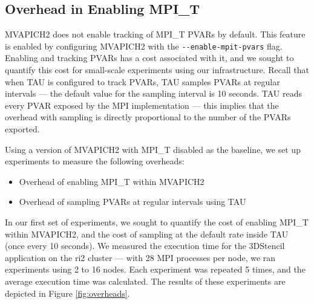 \subsection{Overhead in Enabling MPI\_T}
MVAPICH2 does not enable tracking of MPI\_T PVARs by default. This feature is enabled by configuring MVAPICH2 with the \verb+--enable-mpit-pvars+ flag. Enabling and tracking PVARs has a cost associated with it, and we sought to quantify this cost for small-scale experiments using our infrastructure. Recall that when TAU is configured to track PVARs, TAU samples PVARs at regular intervals --- the default value for the sampling interval is 10 seconds. TAU reads every PVAR exposed by the MPI implementation --- this implies that the overhead with sampling is directly proportional to the number of the PVARs exported. 
\par Using a version of MVAPICH2 with MPI\_T disabled as the baseline, we set up experiments to measure the following overheads:
\begin{itemize}
	\item Overhead of enabling MPI\_T within MVAPICH2
	\item Overhead of sampling PVARs at regular intervals using TAU
\end{itemize}
In our first set of experiments, we sought to quantify the cost of enabling MPI\_T within MVAPICH2, and the cost of sampling at the default rate inside TAU (once every 10 seconds). We measured the execution time for the 3DStencil application on the ri2 cluster --- with 28 MPI processes per node, we ran experiments using 2 to 16 nodes. Each experiment was repeated 5 times, and the average execution time was calculated. The results of these experiments are depicted in Figure \ref{fig:overheads}. 

